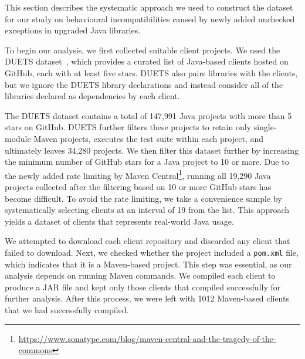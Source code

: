 This section describes the systematic approach we used to construct the dataset for our study on behavioural incompatibilities caused by newly added unchecked exceptions in upgraded Java libraries. 

To begin our analysis, we first collected suitable client projects. We used the DUETS dataset~\cite{durieux21:_duets}, which provides a curated list of Java-based clients hosted on GitHub, each with at least five stars. DUETS also pairs libraries with the clients, but we ignore the DUETS library declarations and instead consider all of the libraries declared as dependencies by each client.

The DUETS dataset contains a total of 147,991 Java projects with more than 5 stars on GitHub. DUETS further filters these projects to retain only single-module Maven projects, executes the test suite within each project, and ultimately leaves 34,280 projects. We then filter this dataset further by increasing the minimum number of GitHub stars for a Java project to 10 or more. Due to the newly added rate limiting by Maven Central\footnote{\url{https://www.sonatype.com/blog/maven-central-and-the-tragedy-of-the-commons}}, running all 19,290 Java projects collected after the filtering based on 10 or more GitHub stars has become difficult. To avoid the rate limiting, we take a convenience sample by systematically selecting clients at an interval of 19 from the list. This approach yields a dataset of clients that represents real-world Java usage.

We attempted to download each client repository and discarded any client that failed to download.
Next, we checked whether the project included a \texttt{pom.xml} file, which indicates that it is a Maven-based project. This step was essential, as our analysis depends on running Maven commands. We compiled each client to produce a JAR file and kept only those clients that compiled successfully for further analysis. After this process, we were left with 1012 Maven-based clients that we had successfully compiled.
